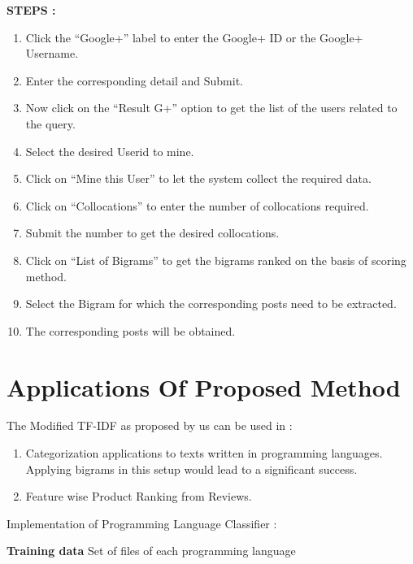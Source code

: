 \documentclass{mnnit}
\begin{document}
\noindent \textbf{STEPS :}

\begin{enumerate}
\item Click  the “Google+” label to enter the Google+ ID or the Google+ Username.
\item Enter the corresponding detail and Submit.
\item Now click on the “Result G+” option to get the list of the users related to the query.
\item Select the desired Userid to mine.
\item Click on “Mine this User” to let the system collect the required data.
\item Click on “Collocations” to enter the number of collocations required.
\item Submit the number to get the desired collocations.
\item Click on “List of Bigrams” to get the bigrams ranked on the basis of scoring method.
\item Select the Bigram for which the corresponding posts need to be extracted.
\item The corresponding posts will be obtained.
\end{enumerate}



\section{Applications Of Proposed Method}

\noindent The Modified TF-IDF as proposed by us can be used in :

\begin{enumerate}
\item Categorization applications to texts written in programming languages. Applying bigrams in this setup would lead to a
significant success\cite{ron}.

\item Feature wise Product Ranking from Reviews.
\end{enumerate}




\noindent Implementation of Programming Language Classifier :

\vspace{1.5 mm}
\noindent \textbf{Training data} \newline
Set of files of each programming language

\vspace{2 mm}
\end{document}
